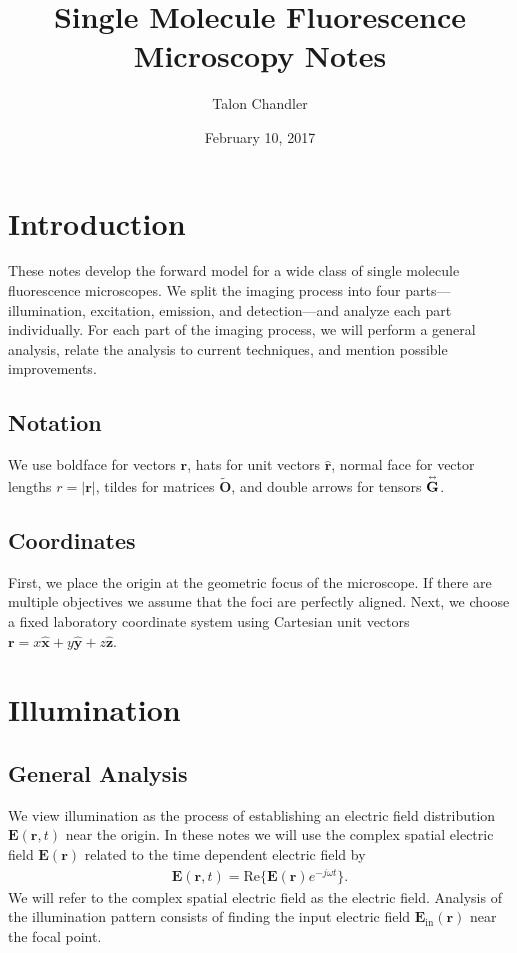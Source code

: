 \documentclass[11pt]{article}
\providecommand{\mb}[1]{\mathbf{#1}}
\providecommand{\mh}[1]{\mathbf{\hat{#1}}}
\newcommand{\tensor}[1]{\overset{\text{\tiny$\leftrightarrow$}}{\mb{#1}}}
\begin{document}
\title{\vspace{-2.5em}Single Molecule Fluorescence Microscopy Notes\vspace{-1em}}
\author{Talon Chandler}%
\date{\vspace{-1em}February 10, 2017\vspace{-1em}}
\maketitle

\section{Introduction}
These notes develop the forward model for a wide class of single molecule
fluorescence microscopes. We split the imaging process into four
parts---illumination, excitation, emission, and detection---and analyze each
part individually. For each part of the imaging process, we will perform a
general analysis, relate the analysis to current techniques, and mention
possible improvements.

\subsection{Notation}
We use boldface for vectors $\mathbf{r}$, hats for unit vectors
$\mathbf{\hat{r}}$, normal face for vector lengths $r = |\mathbf{r}|$, tildes
for matrices $\mb{\tilde{O}}$, and double arrows for tensors $\tensor{\mb{G}}$.

\subsection{Coordinates}
First, we place the origin at the geometric focus of the microscope. If there
are multiple objectives we assume that the foci are perfectly aligned. Next, we
choose a fixed laboratory coordinate system using Cartesian unit vectors
$\mb{r} = x\mh{x} + y\mh{y} + z\mh{z}$.


\section{Illumination}
\subsection{General Analysis}
We view illumination as the process of establishing an electric field
distribution $\mb{E}(\mb{r}, t)$ near the origin. In these notes we
will use the complex spatial electric field $\mb{E}(\mb{r})$ related to the
time dependent electric field by
\begin{align*}
  \mb{E}(\mb{r}, t) = \text{Re}\{\mb{E}(\mb{r})e^{-j\omega t}\}. 
\end{align*}
We will refer to the complex spatial electric field as the electric field.
Analysis of the illumination pattern consists of finding the input electric field
$\mb{E}_{\text{in}}(\mb{r})$ near the focal point.
\end{document}
